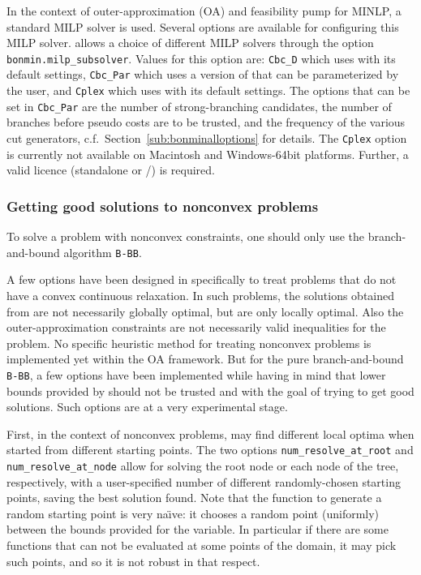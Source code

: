 In the context of outer-approximation (OA) and feasibility pump for MINLP, a standard MILP solver is used.
Several options are available for configuring this MILP solver.
\BONMIN allows a choice of different MILP solvers through the option
\texttt{bonmin.milp\_sub\-sol\-ver}. Values for this option are: {\tt Cbc\_D} which uses \CBC with its
default settings, {\tt Cbc\_Par} which uses a version of \CBC that can be parameterized by the user, and \texttt{Cplex} which uses \CPLEX with its default settings.
The options that can be set in {\tt Cbc\_Par} are the number of strong-branching candidates,
the number of branches before pseudo costs are to be trusted, and the frequency of the various cut generators, c.f.\ Section~\ref{sub:bonminalloptions} for details.
The \texttt{Cplex} option is currently not available on Macintosh and Windows-64bit platforms.
Further, a valid \CPLEX licence (standalone or \GAMS/\CPLEX) is required.

\subsubsection{Getting good solutions to nonconvex problems}
To solve a problem with nonconvex constraints, one should only use the branch-and-bound algorithm {\tt B-BB}.

A few options have been designed in \BONMIN specifically to treat
problems that do not have a convex continuous relaxation.
In such problems, the solutions obtained from \IPOPT are
not necessarily globally optimal, but are only locally optimal.
Also the outer-approximation constraints are not necessarily valid inequalities for the problem.
No specific heuristic method for treating nonconvex problems is implemented
yet within the OA framework.
But for the pure branch-and-bound {\tt B-BB}, a few options have been implemented while having
in mind that lower bounds provided by \IPOPT should not be trusted and with the goal of
trying to get good solutions. Such options are at a very experimental stage.

First, in the context of nonconvex problems, \IPOPT may find different local optima when started
from different starting points. The two options {\tt num\_re\-solve\_at\_root} and {\tt num\_resolve\_at\_node}
allow for solving the root node or each node of the tree, respectively, with a user-specified
number of different randomly-chosen starting points, saving the best solution found.
Note that the function to generate a random starting point is very na\"{\i}ve:
it chooses a random point (uniformly) between the bounds provided for the variable.
In particular if there are some functions that can not be evaluated at some points of the domain, it may pick such points,
and so it is not robust in that respect.

